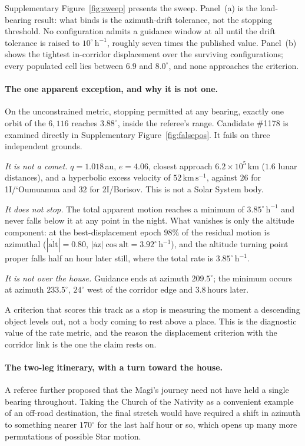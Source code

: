 \documentclass[11pt,a4paper]{article}
\begin{document}
Supplementary Figure~\ref{fig:sweep} presents the sweep. Panel~(a) is the load-bearing
result: what binds is the azimuth-drift tolerance, not the stopping threshold.
No configuration admits a guidance window at all until the drift tolerance is
raised to $10^\circ\,\mathrm{h}^{-1}$, roughly seven times the published value.
Panel~(b) shows the tightest in-corridor displacement over the surviving
configurations; every populated cell lies between $6.9$ and $8.0^\circ$, and
none approaches the criterion.

\paragraph{The one apparent exception, and why it is not one.}
On the unconstrained metric, stopping permitted at any bearing, exactly one
orbit of the $6{,}116$ reaches $3.88^\circ$, inside the referee's range.
Candidate \#1178 is examined directly in Supplementary Figure~\ref{fig:falsepos}. It fails on
three independent grounds.

\emph{It is not a comet.} $q = 1.018$\,au, $e = 4.06$, closest approach
$6.2\times10^{5}$\,km ($1.6$ lunar distances), and a hyperbolic excess velocity
of $52\,\mathrm{km\,s^{-1}}$, against $26$ for 1I/\textquoteleft Oumuamua and $32$ for
2I/Borisov. This is not a Solar System body.

\emph{It does not stop.} The total apparent motion reaches a minimum of
$3.85^\circ\,\mathrm{h}^{-1}$ and never falls below it at any point in the
night. What vanishes is only the altitude component: at the best-displacement
epoch $98\%$ of the residual motion is azimuthal
($|\dot{\mathrm{alt}}| = 0.80$, $|\dot{\mathrm{az}}|\cos\mathrm{alt} = 3.92
^\circ\,\mathrm{h}^{-1}$), and the altitude turning point proper falls half an
hour later still, where the total rate is $3.85^\circ\,\mathrm{h}^{-1}$.

\emph{It is not over the house.} Guidance ends at azimuth $209.5^\circ$; the
minimum occurs at azimuth $233.5^\circ$, $24^\circ$ west of the corridor edge
and $3.8$\,hours later.

A criterion that scores this track as a stop is measuring the moment a
descending object levels out, not a body coming to rest above a place. This is
the diagnostic value of the rate metric, and the reason the displacement
criterion with the corridor link is the one the claim rests on.

\paragraph{The two-leg itinerary, with a turn toward the house.}
A referee further proposed that the Magi's journey need not have held a single
bearing throughout. Taking the Church of the Nativity as a convenient example
of an off-road destination, the final stretch would have required a shift in
azimuth to something nearer $170^\circ$ for the last half hour or so, which
opens up many more permutations of possible Star motion.
\end{document}
